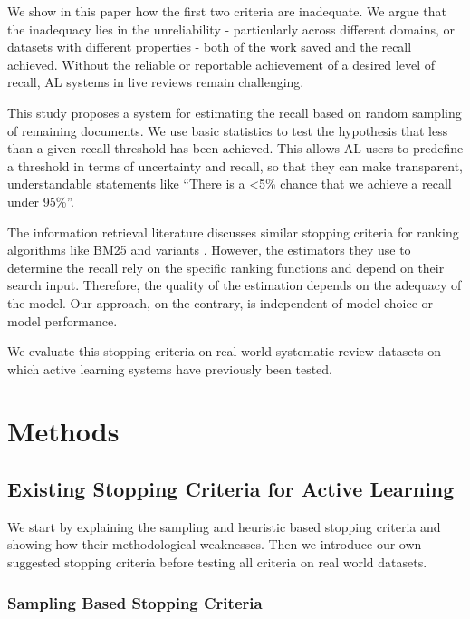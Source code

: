 \documentclass{bmcart}
\begin{document}
	We show in this paper how the first two criteria are inadequate.
	We argue that the inadequacy lies in the unreliability - particularly across different domains, or datasets with different properties  - both of the work saved and the recall achieved.  
	Without the reliable or reportable achievement of a desired level of recall, AL systems in live reviews remain challenging.
	
	This study proposes a system for estimating the recall based on random sampling of remaining documents. 
	We use basic statistics to test the hypothesis that less than a given recall threshold has been achieved.
	This allows AL users to predefine a threshold in terms of uncertainty and recall, so that they can make transparent, understandable statements like ``There is a <5\% chance that we achieve a recall under 95\%''.
	
	The information retrieval literature discusses similar stopping criteria for ranking algorithms like BM25 and variants \cite{DiNunzio2018, Yu2019}. However, the estimators they use to determine the recall rely on the specific ranking functions and depend on their search input. Therefore, the quality of the estimation depends on the adequacy of the model. Our approach, on the contrary, is independent of model choice or model performance. 
	
	We evaluate this stopping criteria on real-world systematic review datasets on which active learning systems have previously been tested.
	
	\section*{Methods}
	
	\subsection*{Existing Stopping Criteria for Active Learning}
	
	We start by explaining the sampling and heuristic based stopping criteria and showing how their methodological weaknesses. 
	Then we introduce our own suggested stopping criteria before testing all criteria on real world datasets.
	
	\subsubsection*{Sampling Based Stopping Criteria}
	
\end{document}
